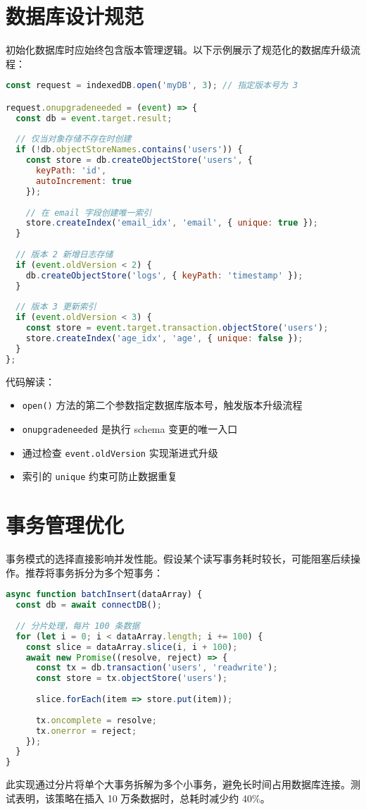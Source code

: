 \section{数据库设计规范}
初始化数据库时应始终包含版本管理逻辑。以下示例展示了规范化的数据库升级流程：\par
\begin{lstlisting}[language=javascript]
const request = indexedDB.open('myDB', 3); // 指定版本号为 3

request.onupgradeneeded = (event) => {
  const db = event.target.result;
  
  // 仅当对象存储不存在时创建
  if (!db.objectStoreNames.contains('users')) {
    const store = db.createObjectStore('users', {
      keyPath: 'id',
      autoIncrement: true
    });
    
    // 在 email 字段创建唯一索引
    store.createIndex('email_idx', 'email', { unique: true });
  }
  
  // 版本 2 新增日志存储
  if (event.oldVersion < 2) {
    db.createObjectStore('logs', { keyPath: 'timestamp' });
  }
  
  // 版本 3 更新索引
  if (event.oldVersion < 3) {
    const store = event.target.transaction.objectStore('users');
    store.createIndex('age_idx', 'age', { unique: false });
  }
};
\end{lstlisting}
代码解读：\par
\begin{itemize}
\item \verb!open()! 方法的第二个参数指定数据库版本号，触发版本升级流程
\item \verb!onupgradeneeded! 是执行 schema 变更的唯一入口
\item 通过检查 \verb!event.oldVersion! 实现渐进式升级
\item 索引的 \verb!unique! 约束可防止数据重复
\end{itemize}
\section{事务管理优化}
事务模式的选择直接影响并发性能。假设某个读写事务耗时较长，可能阻塞后续操作。推荐将事务拆分为多个短事务：\par
\begin{lstlisting}[language=javascript]
async function batchInsert(dataArray) {
  const db = await connectDB();
  
  // 分片处理，每片 100 条数据
  for (let i = 0; i < dataArray.length; i += 100) {
    const slice = dataArray.slice(i, i + 100);
    await new Promise((resolve, reject) => {
      const tx = db.transaction('users', 'readwrite');
      const store = tx.objectStore('users');
      
      slice.forEach(item => store.put(item));
      
      tx.oncomplete = resolve;
      tx.onerror = reject;
    });
  }
}
\end{lstlisting}
此实现通过分片将单个大事务拆解为多个小事务，避免长时间占用数据库连接。测试表明，该策略在插入 10 万条数据时，总耗时减少约 40\%{}。\par
